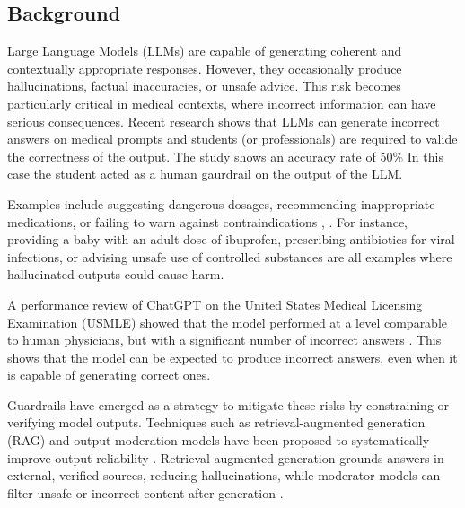 %

\subsection{Background}

Large Language Models (LLMs) are capable of generating coherent and contextually appropriate responses.
However, they occasionally produce hallucinations, factual inaccuracies, or unsafe advice.
This risk becomes particularly critical in medical contexts, where incorrect information can have serious consequences.
Recent research \citep{waldock2025curriculum} shows that LLMs can generate incorrect answers on medical prompts and students (or professionals) are required to valide the correctness of the output.
The study shows an accuracy rate of 50\% In this case the student acted as a human gaurdrail on the output of the LLM.

Examples include suggesting dangerous dosages, recommending inappropriate medications, or failing to warn against contraindications \citep{luo2024clinical}, \citep{schieszer2023large}.
For instance, providing a baby with an adult dose of ibuprofen, prescribing antibiotics for viral infections, or advising unsafe use of controlled substances are all examples where hallucinated outputs could cause harm.

A performance review of ChatGPT on the United States Medical Licensing Examination (USMLE) showed that the model performed at a level comparable to human physicians, but with a significant number of incorrect answers \citep{kung2023performance}.
This shows that the model can be expected to produce incorrect answers, even when it is capable of generating correct ones.

Guardrails have emerged as a strategy to mitigate these risks by constraining or verifying model outputs.
Techniques such as retrieval-augmented generation (RAG) and output moderation models have been proposed to systematically improve output reliability \citep{dong2024guardrails}.
Retrieval-augmented generation grounds answers in external, verified sources, reducing hallucinations, while moderator models can filter unsafe or incorrect content after generation \citep{inan2023llamaguard}.

